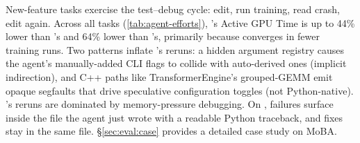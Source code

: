 New-feature tasks exercise the test--debug cycle: edit, run
training, read crash, edit again.
Across all tasks (\autoref{tab:agent-efforts}), \sys's Active GPU Time is up to 44\% lower than \megatron's and 64\% lower than \torchtitan's, primarily because \sys converges in fewer training runs.
Two patterns inflate \megatron's reruns: a hidden argument
registry causes the agent's manually-added CLI flags to collide
with auto-derived ones (implicit indirection), and C++ paths like
TransformerEngine's grouped-GEMM emit opaque segfaults that drive
speculative configuration toggles (not Python-native).
\torchtitan's reruns are dominated by memory-pressure debugging.
On \sys, failures surface inside the file the agent just wrote
with a readable Python traceback, and fixes stay in the same
file. \S\ref{sec:eval:case} provides a detailed case study on
MoBA.

